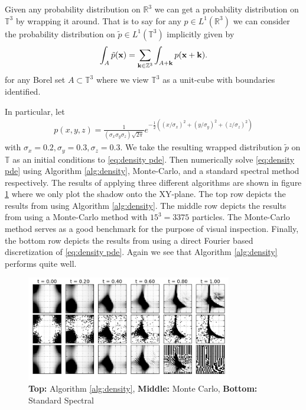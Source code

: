 \documentclass[final,leqno]{siamltex1213}
\begin{document}
Given any probability distribution on $\mathbb{R}^{3}$ we can get a probability distribution on $\mathbb{T}^{3}$ by wrapping it around.
That is to say for any $p \in L^{1}(\mathbb{R}^{3})$ we can consider the probability distribution on $\tilde{p} \in L^{1}(\mathbb{T}^{3})$ implicitly given by
\begin{align*}
	\int_{A} \tilde{p}( {\bf x} ) = \sum_{ {\bf k} \in \mathbb{Z}^{3} } \int_{A + {\bf k} } p( {\bf x} + {\bf k} ).
\end{align*}
for any Borel set $A \subset \mathbb{T}^{3}$ where we view $\mathbb{T}^{3}$ as a unit-cube with boundaries identified.

In particular, let
\begin{align}
	p(x,y,z) = \frac{1}{ (\sigma_{x} \sigma_{y} \sigma_{z} )\sqrt{ 2\pi } } e^{ - \frac{1}{2} ( (x/\sigma_{x})^{2} + (y/\sigma_{y})^{2} +  (z/\sigma_{z})^{2} )}
\end{align}
with $\sigma_{x} = 0.2, \sigma_{y} = 0.3, \sigma_{z} = 0.3$.
We take the resulting wrapped distribution $\tilde{p}$ on $\mathbb{T}$ as an initial conditions to \eqref{eq:density pde}.
Then numerically solve \eqref{eq:density pde} using Algorithm \ref{alg:density}, Monte-Carlo, and a standard spectral method respectively.
The results of applying three different algorithms are shown in figure \ref{fig:ABCD} where we only plot the shadow onto the XY-plane.
The top row depicts the results from using Algorithm \ref{alg:density}.
The middle row depicts the results from using a Monte-Carlo method with $15^{3} = 3375$ particles.
The Monte-Carlo method serves as a good benchmark for the purpose of visual inspection.
Finally, the bottom row depicts the results from using a direct Fourier based discretization of \eqref{eq:density pde}.
Again we see that Algorithm \ref{alg:density} performs quite well.


\begin{figure}
	\centering
	\includegraphics[width=0.8\textwidth]{./images/ABCD_flow.png}
	\caption{ \tiny {\bf Top:} Algorithm \ref{alg:density}, {\bf Middle:} Monte Carlo, {\bf Bottom:} Standard Spectral}
	\label{fig:ABCD}
\end{figure}
\end{document}
